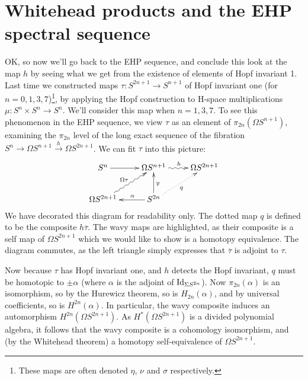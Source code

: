 \documentclass{article}
\newcommand{\OutputWhiteheadProductsAndTheEHPSS}{16}
\providecommand{\OutputWhiteheadProductsAndTheEHPSS}{16}
\newcommand{\Loops}{\Omega}
\begin{document}
\section{Whitehead products and the EHP spectral sequence} %
\label{WhiteheadProductsAndTheEHPSS}
\ifx\OutputWhiteheadProductsAndTheEHPSS\undefined\else
OK, so now we'll go back to the EHP sequence, and conclude this look at the map $h$ by seeing what we get from the existence of elements of Hopf invariant 1.  Last time we constructed maps $\tau: S^{2n+1} \to S^{n+1}$ of Hopf invariant one (for $n=0,1,3,7$)\footnote{These maps are often denoted $\eta$, $\nu$ and $\sigma$ respectively.}, by applying the Hopf construction to H-space multiplications $\mu:S^n \times S^n \to S^n$.  We'll consider this map when $n=1,3,7$. To see this phenomenon in the EHP sequence, we view $\tau$ as an element of $\pi_{2n}(\Omega S^{n+1})$, examining the $\pi_{2n}$ level of the long exact sequence of the fibration $S^{n} \to \Loops S^{n+1} \stackrel{h}{\to} \Loops S^{2n+1}$.  We can fit $\tau$ into this picture:
\[\xymatrix{
S^n\ar[r]&\Omega S^{n+1}\ar@{~>}[r]^h&\Omega S^{2n+1}\\
\Omega S^{2n+1}\ar@{~>}[ur]^{\Omega\tau}&S^{2n}\ar[l]_{\ \ \ \alpha}\ar[u]_{\overline\tau}\ar@{..>}[ur]_q
}\]
We have decorated this diagram for readability only. The dotted map $q$ is defined to be the composite $h\overline\tau$. The wavy maps are highlighted, as their composite is a self map of $\Omega S^{2n+1}$ which we would like to show is a homotopy equivalence. The diagram commutes, as the left triangle simply expresses that $\overline\tau$ is adjoint to $\tau$.

Now because $\tau$ has Hopf invariant one, and $h$ detects the Hopf invariant, $q$ must be homotopic to $\pm\alpha$ (where $\alpha$ is the adjoint of $\textup{Id}_{\Sigma S^{2n}}$). Now $\pi_{2n}(\alpha)$ is an isomorphism, so by the Hurewicz theorem, so is $H_{2n}(\alpha)$, and by universal coefficients, so is $H^{2n}(\alpha)$. In particular, the wavy composite induces an automorphism $H^{2n}(\Omega S^{2n+1})$. As $H^*(\Omega S^{2n+1})$ is a divided polynomial algebra, it follows that the wavy composite is a cohomology isomorphism, and (by the Whitehead theorem) a homotopy self-equivalence
of $\Omega S^{2n+1}$.
\end{document}
